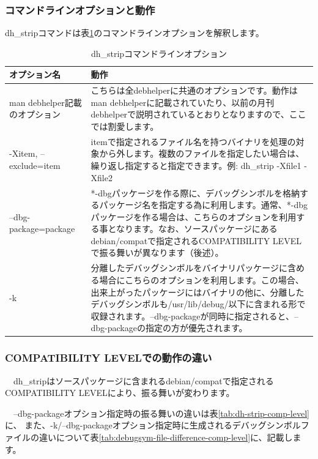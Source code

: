 \documentclass[mingoth,a4paper]{jsarticle}
\begin{document}
\subsubsection{コマンドラインオプションと動作}

 dh\_stripコマンドは表\ref{tab:dh-strip-opt}のコマンドラインオプションを解釈します。

\begin{table}[ht]
\begin{center}
\small
\begin{tabular}{|p{8em}|p{35em}|}
\hline
オプション名&動作 \\ \hline \hline
man debhelper記載のオプション & こちらは全debhelperに共通のオプションです。動作はman debhelperに記載されていたり、以前の月刊debhelperで説明されているとおりとなりますので、ここでは割愛します。 \\ \hline
-Xitem, --exclude=item & itemで指定されるファイル名を持つバイナリを処理の対象から外します。複数のファイルを指定したい場合は、繰り返し指定すると指定できます。例: dh\_strip -Xfile1 -Xfile2 \\ \hline
--dbg-package=package & *-dbgパッケージを作る際に、デバッグシンボルを格納するパッケージ名を指定する為に利用します。通常、*-dbgパッケージを作る場合は、こちらのオプションを利用する事となります。なお、ソースパッケージにあるdebian/compatで指定されるCOMPATIBILITY LEVELで振る舞いが異なります（後述）。\\ \hline
-k & 分離したデバッグシンボルをバイナリパッケージに含める場合にこちらのオプションを利用します。この場合、出来上がったパッケージにはバイナリの他に、分離したデバッグシンボルも/usr/lib/debug/以下に含まれる形で収録されます。--dbg-packageが同時に指定されると、--dbg-packageの指定の方が優先されます。\\ \hline
\end{tabular}
\caption{dh\_stripコマンドラインオプション}
\label{tab:dh-strip-opt}
\end{center}
\end{table}

\subsubsection{COMPATIBILITY LEVELでの動作の違い}

　dh\_stripはソースパッケージに含まれるdebian/compatで指定される
COMPATIBILITY LEVELにより、振る舞いが変わります。

　--dbg-packageオプション指定時の振る舞いの違いは表\ref{tab:dh-strip-comp-level}に、
また、-k/--dbg-packageオプション指定時に生成されるデバッグシンボルファイルの違いについて表\ref{tab:debugsym-file-difference-comp-level}に、記載します。
\end{document}
